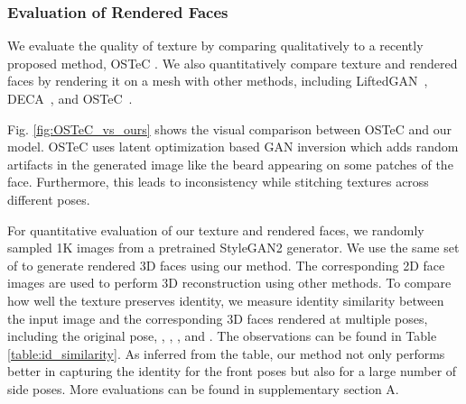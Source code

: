 \documentclass[10pt,twocolumn,letterpaper]{article}
\begin{document}
\subsubsection{Evaluation of Rendered Faces}


We evaluate the quality of texture by comparing qualitatively to a recently proposed method, OSTeC \cite{Gecer_2021_CVPR}. We also quantitatively compare texture and rendered faces by rendering it on a mesh with other methods, including LiftedGAN~\cite{shi2021lifting}, DECA~\cite{deca}, and OSTeC~\cite{Gecer_2021_CVPR}.

Fig. \ref{fig:OSTeC_vs_ours} shows the visual comparison between OSTeC \cite{Gecer_2021_CVPR} and our model.  OSTeC uses latent optimization based GAN inversion which adds random artifacts in the generated image like the beard appearing on some patches of the face. Furthermore, this leads to inconsistency while stitching textures across different poses.




For quantitative evaluation of our texture and rendered faces, we randomly sampled 1K images from a pretrained StyleGAN2 generator. We use the same set of  to generate rendered 3D faces using our method. The corresponding 2D face images are used to perform 3D reconstruction using other methods\cite{deca, Gecer_2021_CVPR, shi2021lifting}. To compare how well the texture preserves identity, we measure identity similarity between the input image and the corresponding 3D faces rendered at multiple poses, including the original pose, \textdegree, \textdegree, \textdegree, and \textdegree.  The observations can be found in Table \ref{table:id_similarity}. As inferred from the table, our method not only performs better in capturing the identity for the front poses but also for a large number of side poses. More evaluations can be found in supplementary section A.








\begin{table}[h]
\centering

\vspace{-1mm}
\caption{ID similarity comparison between the input image and the corresponding 3D face rendered at various poses.}
\vspace{-4mm}
\end{table}
\end{document}
